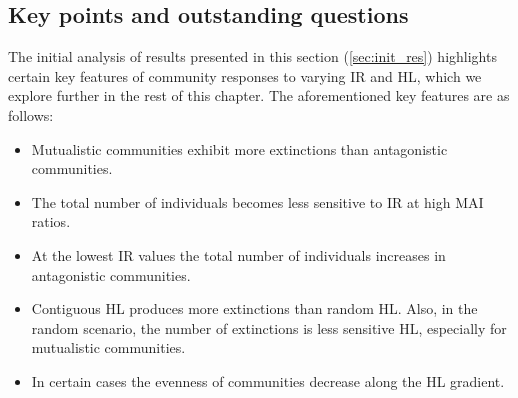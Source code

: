 \subsection{Key points and outstanding questions}
\label{sec:questions}


The initial analysis of results presented in this section (\ref{sec:init_res}) highlights certain key features of community responses to varying IR and HL, which we explore further in the rest of this chapter. The aforementioned key features are as follows:

\begin{itemize}
	\item Mutualistic communities exhibit more extinctions than antagonistic communities.
	\item The total number of individuals becomes less sensitive to IR at high MAI ratios.
	\item At the lowest IR values the total number of individuals increases in antagonistic communities.
	\item Contiguous HL produces more extinctions than random HL. Also, in the random scenario, the number of extinctions is less sensitive HL, especially for mutualistic communities.
	\item In certain cases the evenness of communities decrease along the HL gradient.
\end{itemize}

